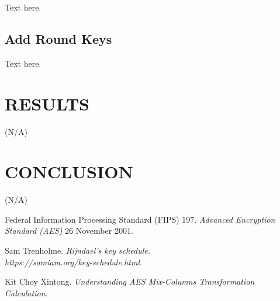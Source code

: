 \documentclass[a4paper, 10pt]{article}
\begin{document}
\begin{multicols}{2}
            Text here.

            \subsection{Add Round Keys}

            Text here.

        \section{RESULTS}

        (N/A)

        \section{CONCLUSION}

        (N/A)

        \begin{thebibliography}{3}
            Federal Information Processing Standard (FIPS) 197.
            \textit{Advanced Encryption Standard (AES)}
            26 November 2001.

            Sam Trenholme.
            \textit{Rijndael's key schedule.\\https://samiam.org/key-schedule.html}.

            Kit Choy Xintong.
            \textit{Understanding AES Mix-Columns Transformation Calculation}.
        \end{thebibliography}

    \end{multicols}
\end{document}
